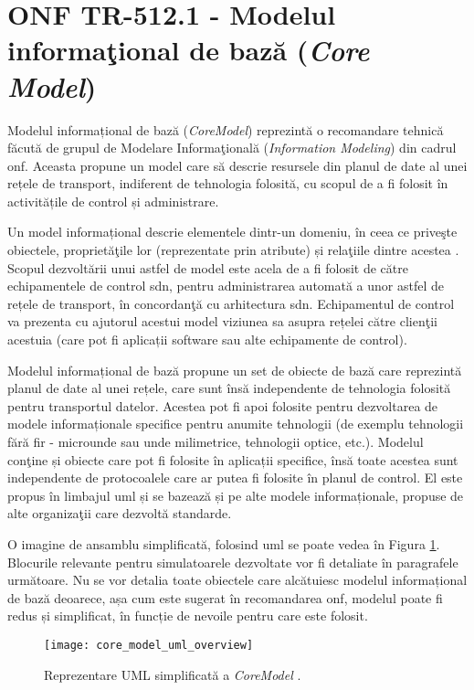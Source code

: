 \section{ONF TR-512.1 - Modelul informaţional de bază (\textit{Core Model})}

Modelul informațional de bază (\textit{CoreModel}) reprezintă o recomandare tehnică făcută de grupul de Modelare Informaţională (\textit{Information Modeling}) din cadrul \gls{onf}. Aceasta propune un model care să descrie resursele din planul de date al unei rețele de transport, indiferent de tehnologia folosită, cu scopul de a fi folosit în activitățile de control și administrare.

Un model informațional descrie elementele dintr-un domeniu, în ceea ce priveşte obiectele, proprietăţile lor (reprezentate prin atribute) și relaţiile dintre acestea \cite{onftr512v1.0}. Scopul dezvoltării unui astfel de model este acela de a fi folosit de către echipamentele de control \gls{sdn}, pentru administrarea automată a unor astfel de rețele de transport, în concordanţă cu arhitectura \gls{sdn}. Echipamentul de control va prezenta cu ajutorul acestui model viziunea sa asupra rețelei către clienţii acestuia (care pot fi aplicații software sau alte echipamente de control).

Modelul informațional de bază propune un set de obiecte de bază care reprezintă planul de date al unei rețele, care sunt însă independente de tehnologia folosită pentru transportul datelor. Acestea pot fi apoi folosite pentru dezvoltarea de modele informaționale specifice pentru anumite tehnologii (de exemplu tehnologii fără fir - microunde sau unde milimetrice, tehnologii optice, etc.). Modelul conţine și obiecte care pot fi folosite în aplicații specifice, însă toate acestea sunt independente de protocoalele care ar putea fi folosite în planul de control. El este propus în limbajul \gls{uml} și se bazează și pe alte modele informaționale, propuse de alte organizaţii care dezvoltă standarde.

O imagine de ansamblu simplificată, folosind \gls{uml} se poate vedea în Figura \ref{fig:core_model}. Blocurile relevante pentru simulatoarele dezvoltate vor fi detaliate în paragrafele următoare. Nu se vor detalia toate obiectele care alcătuiesc modelul informațional de bază deoarece, așa cum este sugerat în recomandarea \gls{onf}, modelul poate fi redus și simplificat, în funcție de nevoile pentru care este folosit.  

\begin{figure}[h]
	\centering
	\texttt{[image: core\_model\_uml\_overview]}
	\caption{Reprezentare UML simplificată a \textit{CoreModel} \cite{onftr512v1.2}.}
	\label{fig:core_model}
\end{figure}

